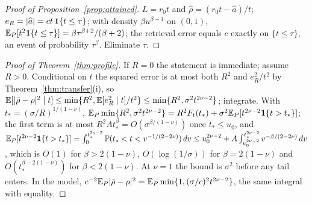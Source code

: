 \begin{proof}[Proof of Proposition~\ref{prop:attained}]
$L=r_0t$ and $\widehat\rho=(r_0t-\widehat a)/t$; $e_R=|\widehat a|=ct\,\mathbf{1}\{t\le\tau\}$; with density
$\beta u^{\beta-1}$ on $(0,1)$, $\mathbb{E}_P[t^2\mathbf{1}\{t\le\tau\}]=\beta\tau^{\beta+2}/(\beta+2)$; the retrieval error equals
$c$ exactly on $\{t\le\tau\}$, an event of probability $\tau^\beta$. Eliminate $\tau$.
\end{proof}

\begin{proof}[Proof of Theorem~\ref{thm:profile}]
If $R=0$ the statement is immediate; assume $R>0$. Conditional on $t$ the squared error is at most both $R^2$ and $e_R^2/t^2$ by Theorem~\ref{thm:transfer}(i), so
$\mathbb{E}[|\bar\rho-\rho|^2\mid t]\le\min\{R^2,\mathbb{E}[e_R^2\mid t]/t^2\}\le\min\{R^2,\sigma^2t^{2\nu-2}\}$; integrate. With
$t_*=(\sigma/R)^{1/(1-\nu)}$,
$\mathbb{E}_P\min\{R^2,\sigma^2t^{2\nu-2}\}=R^2F_t(t_*)+\sigma^2\mathbb{E}_P[t^{2\nu-2}\mathbf{1}\{t>t_*\}]$; the first term is at most
$R^2At_*^\beta=O(\sigma^{\beta/(1-\nu)})$ once $t_*\le u_0$, and
$\mathbb{E}_P[t^{2\nu-2}\mathbf{1}\{t>t_*\}]=\int_0^{t_*^{2\nu-2}}\mathbb{P}(t_*<t<v^{-1/(2-2\nu)})\,dv
\le u_0^{2\nu-2}+A\int_{u_0^{2\nu-2}}^{t_*^{2\nu-2}}v^{-\beta/(2-2\nu)}\,dv$, which is $O(1)$ for
$\beta>2(1-\nu)$, $O(\log(1/\sigma))$ for $\beta=2(1-\nu)$ and $O(t_*^{\beta-2(1-\nu)})$ for $\beta<2(1-\nu)$. At
$\nu=1$ the bound is $\sigma^2$ before any tail enters. In the model,
$c^{-2}\mathbb{E}_P|\bar\rho-\rho|^2=\mathbb{E}_P\min\{1,(\sigma/c)^2t^{2\nu-2}\}$, the same integral with equality.
\end{proof}

